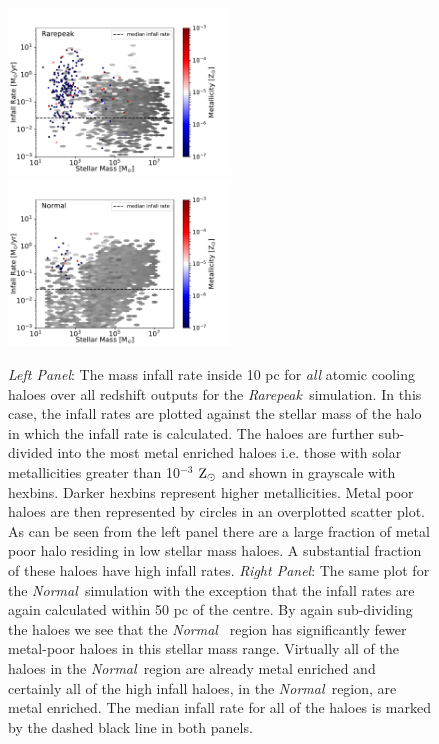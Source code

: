 \documentclass[graphics, twocolumn, usenatbib]{mn2e}
\newcommand{\zsolar} {$\rm{Z_{\odot}}~$}
\newcommand{\rarepeak} {\textit{Rarepeak~}}
\newcommand{\normal} {\textit{Normal~}}
\begin{document}
\begin{figure}
\end{figure}
\begin{figure}
\centering
\begin{minipage}{175mm}      \begin{center} 
\centerline{
\includegraphics[width=0.525\textwidth]{FIGURES/Rarepeak_MdotMstellarZ_Hexbin.pdf}
\includegraphics[width=0.525\textwidth]{FIGURES/Normal_MdotMstellarZ_Hexbin.pdf}}
\caption{\textit{Left Panel}: The mass infall rate inside 10 pc for \textit{all} atomic
  cooling haloes over all redshift outputs for the \rarepeak simulation. In this case,
  the infall rates are plotted against the stellar mass of the halo in which the infall rate is
  calculated. The haloes are further sub-divided into the most metal enriched haloes
  i.e. those with solar metallicities greater than 10$^{-3}$ \zsolar and shown in grayscale with hexbins.
  Darker hexbins represent higher metallicities. Metal poor haloes are then represented by circles in
  an overplotted scatter plot. As can be seen from the left panel there are a large fraction of
  metal poor halo residing in low stellar mass haloes. A substantial fraction of these haloes have
  high infall rates. 
  \textit{Right Panel}: The same plot for the \normal simulation with the exception that the infall rates are 
  again calculated within 50 pc of the centre. By again sub-dividing the haloes we see that the \normal
  region has significantly fewer metal-poor haloes in this stellar mass range. Virtually all of the
  haloes in the \normal region are already metal enriched and certainly all of the high infall haloes,
  in the \normal region, are metal enriched. 
  The median infall rate for all of the haloes is marked by the dashed black line in both panels.} \label{Fig:StellarMass}
\end{center} \end{minipage}

\end{figure}
\end{document}
